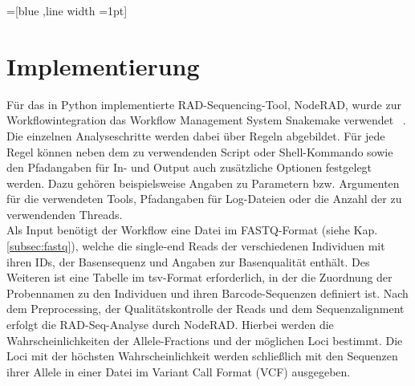 =[blue ,line  width =1pt]
\newcommand{\fun}[3]{%
	\path [dashedline] (#1.east) -- node [above]
	{\scriptsize #2} (#3);}
\chapter{Implementierung} \label{sec:alg}
Für das in Python implementierte RAD-Sequencing-Tool, NodeRAD, wurde zur Workflowintegration das Workflow Management System Snakemake verwendet ~\cite{koester_2012_1, koester_2012_2}. Die einzelnen Analyseschritte werden dabei über Regeln abgebildet. Für jede Regel können neben dem zu verwendenden Script oder Shell-Kommando sowie den Pfadangaben für In- und Output auch zusätzliche Optionen festgelegt werden. Dazu gehören beispielsweise Angaben zu Parametern bzw. Argumenten für die verwendeten Tools, Pfadangaben für Log-Dateien oder die Anzahl der zu verwendenden Threads. \\

Als Input benötigt der Workflow eine Datei im FASTQ-Format (siehe Kap. \ref{subsec:fastq}), welche die single-end Reads der verschiedenen Individuen mit ihren IDs, der Basensequenz und Angaben zur Basenqualität enthält. Des Weiteren ist eine Tabelle im tsv-Format erforderlich, in der die Zuordnung der Probennamen zu den Individuen und ihren Barcode-Sequenzen definiert ist. Nach dem Preprocessing, der Qualitätskontrolle der Reads und dem Sequenzalignment erfolgt die RAD-Seq-Analyse durch NodeRAD. Hierbei werden die Wahrscheinlichkeiten der Allele-Fractions und der möglichen Loci bestimmt. Die Loci mit der höchsten Wahrscheinlichkeit werden schließlich mit den Sequenzen ihrer Allele in einer Datei im Variant Call Format (VCF) ausgegeben.

